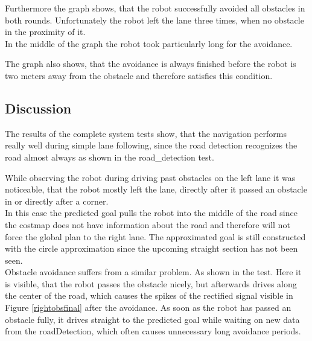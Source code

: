 Furthermore the graph shows, that the robot successfully avoided all obstacles in both rounds. Unfortunately the robot left the lane three times, when no obstacle in the proximity of it.\\

In the middle of the graph the robot took particularly long for the avoidance.

The graph also shows, that the avoidance is always finished before the robot is two meters away from the obstacle and therefore satisfies this condition.

\subsection{Discussion}

The results of the complete system tests show, that the navigation performs really well during simple lane following, since the road detection recognizes the road almost always as shown in the road\_detection test.

While observing the robot during driving past obstacles on the left lane it was noticeable, that the robot mostly left the lane, directly after it passed an obstacle in or directly after a corner.\\ 
In this case the predicted goal pulls the robot into the middle of the road since the costmap does not have information about the road and therefore will not force the global plan to the right lane. The approximated goal is still constructed with the circle approximation since the upcoming straight section has not been seen.\\

Obstacle avoidance suffers from a similar problem. As shown in the  test. Here it is visible, that the robot passes the obstacle nicely, but afterwards drives along the center of the road, which causes the spikes of the rectified signal visible in Figure \ref{rightobsfinal} after the avoidance. As soon as the robot has passed an obstacle fully, it drives straight to the predicted goal while waiting on new data from the roadDetection, which often causes unnecessary long avoidance periods.





